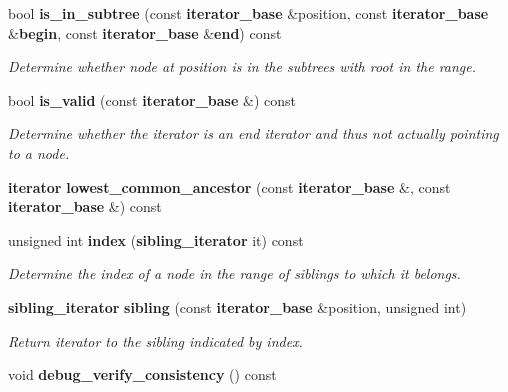 \begin{DoxyCompactItemize}
bool {\bf is\+\_\+in\+\_\+subtree} (const {\bf iterator\+\_\+base} \&position, const {\bf iterator\+\_\+base} \&{\bf begin}, const {\bf iterator\+\_\+base} \&{\bf end}) const 
\begin{DoxyCompactList}\small\item\em Determine whether node at position is in the subtrees with root in the range. \end{DoxyCompactList}\item 
bool {\bf is\+\_\+valid} (const {\bf iterator\+\_\+base} \&) const 
\begin{DoxyCompactList}\small\item\em Determine whether the iterator is an \textquotesingle{}end\textquotesingle{} iterator and thus not actually pointing to a node. \end{DoxyCompactList}\item 
{\bf iterator} {\bf lowest\+\_\+common\+\_\+ancestor} (const {\bf iterator\+\_\+base} \&, const {\bf iterator\+\_\+base} \&) const 
\item 
unsigned int {\bf index} ({\bf sibling\+\_\+iterator} it) const 
\begin{DoxyCompactList}\small\item\em Determine the index of a node in the range of siblings to which it belongs. \end{DoxyCompactList}\item 
{\bf sibling\+\_\+iterator} {\bf sibling} (const {\bf iterator\+\_\+base} \&position, unsigned int)
\begin{DoxyCompactList}\small\item\em Return iterator to the sibling indicated by index. \end{DoxyCompactList}\item 
void {\bf debug\+\_\+verify\+\_\+consistency} () const 
\end{DoxyCompactItemize}
